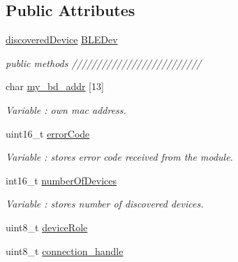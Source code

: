 \subsection*{Public Attributes}
\begin{DoxyCompactItemize}
\item 
\hyperlink{structdiscovered_device}{discovered\+Device} \hyperlink{class_wasp_b_l_e_a3dfcc1e03881a3f47a550ecf28c7de83}{B\+L\+E\+Dev}
\begin{DoxyCompactList}\small\item\em public methods ////////////////////////// \end{DoxyCompactList}\item 
char \hyperlink{class_wasp_b_l_e_a19d28f935b67a358cef9eaa717e49eba}{my\+\_\+bd\+\_\+addr} \mbox{[}13\mbox{]}\hypertarget{class_wasp_b_l_e_a19d28f935b67a358cef9eaa717e49eba}{}\label{class_wasp_b_l_e_a19d28f935b67a358cef9eaa717e49eba}

\begin{DoxyCompactList}\small\item\em Variable \+: own mac address. \end{DoxyCompactList}\item 
uint16\+\_\+t \hyperlink{class_wasp_b_l_e_ab87043b264f6214947fd0e2bf6693f87}{error\+Code}\hypertarget{class_wasp_b_l_e_ab87043b264f6214947fd0e2bf6693f87}{}\label{class_wasp_b_l_e_ab87043b264f6214947fd0e2bf6693f87}

\begin{DoxyCompactList}\small\item\em Variable \+: stores error code received from the module. \end{DoxyCompactList}\item 
int16\+\_\+t \hyperlink{class_wasp_b_l_e_acd1a850159f48ccdcb172a20758783ee}{number\+Of\+Devices}\hypertarget{class_wasp_b_l_e_acd1a850159f48ccdcb172a20758783ee}{}\label{class_wasp_b_l_e_acd1a850159f48ccdcb172a20758783ee}

\begin{DoxyCompactList}\small\item\em Variable \+: stores number of discovered devices. \end{DoxyCompactList}\item 
uint8\+\_\+t \hyperlink{class_wasp_b_l_e_a52ffe5e340fa3f94336fddc227440132}{device\+Role}
\item 
uint8\+\_\+t \hyperlink{class_wasp_b_l_e_adb324650f5d362e9abb347e9e81be088}{connection\+\_\+handle}\hypertarget{class_wasp_b_l_e_adb324650f5d362e9abb347e9e81be088}{}\label{class_wasp_b_l_e_adb324650f5d362e9abb347e9e81be088}


\end{DoxyCompactItemize}

